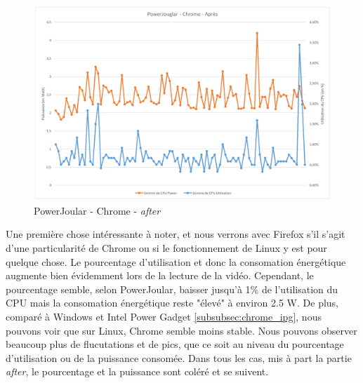 \documentclass[12pt, a4paper]{report}
\begin{document}
\begin{figure}[H]
    \includegraphics[width=1\linewidth]{res//graph/PowerJoular/chrome-after.png}
    \caption{PowerJoular - Chrome - \textit{after}}
    \label{fig:pj_chrome_after}
\end{figure}
Une première chose intéressante à noter, et nous verrons avec Firefox s'il s'agit d'une particularité de Chrome ou si le fonctionnement de Linux y est pour quelque chose. Le pourcentage d'utilisation et donc la consomation énergétique augmente bien évidemment lors de la lecture de la vidéo. Cependant, le pourcentage semble, selon PowerJoular, baisser jusqu'à 1\% de l'utilisation du CPU mais la consomation énergétique reste "élevé" à environ 2.5 W.
De plus, comparé à Windows et Intel Power Gadget \ref{subsubsec:chrome_ipg}, nous pouvons voir que sur Linux, Chrome semble moins stable. Nous pouvons observer beaucoup plus de flucutations et de pics, que ce soit au niveau du pourcentage d'utilisation ou de la puissance consomée. 
Dans tous les cas, mis à part la partie \textit{after}, le pourcentage et la puissance sont coléré et se suivent.
\end{document}
